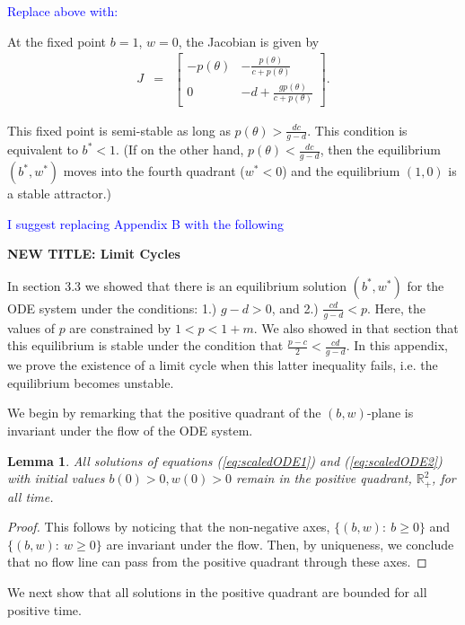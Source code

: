 \documentclass[review,authoryear]{elsarticle}
\newtheorem{lemma}[theorem]{Lemma}
\begin{document}
\textcolor{blue}{Replace above with:}

At the fixed point $b=1$, $w=0$, the Jacobian is given by 
\begin{eqnarray*}
  J & = & \left[
          \begin{array}{cc}
            -p(\theta) & -\frac{p(\theta)}{c+p(\theta)} \\
            0 & -d+\frac{gp(\theta)}{c+p(\theta)}
          \end{array}
          \right].
\end{eqnarray*}

This fixed point is semi-stable as long as $p(\theta) >\frac{dc}{g-d}$.  This condition is equivalent to $b^* < 1$.  (If on the other hand, $p(\theta) <\frac{dc}{g-d}$, then the equilibrium $(b^*,w^*)$ moves into the fourth quadrant ($w^*<0$) and the equilibrium $(1,0)$ is a stable attractor.)

\textcolor{blue}{I suggest replacing Appendix B with the following}

\textbf{NEW TITLE:  Limit Cycles}

In section 3.3 we showed that there is an equilibrium solution $(b^*,w^*)$ for the ODE system under the conditions:  1.)  $g-d>0$, and 2.) $\frac{cd}{g-d}<p$.   Here, the values of  $p$ are constrained by $1<p<1+m$.   We also showed in that section that this 
equilibrium is stable under the condition that $\frac{p-c}{2} < \frac{cd}{g-d}.$   In this appendix, we prove the existence of a limit cycle when this latter inequality fails, i.e. the equilibrium becomes unstable.

We begin by remarking that the positive quadrant of the $(b,w)$-plane is invariant under the flow of the ODE system.

\begin{lemma}


All solutions of equations (\ref{eq:scaledODE1}) and
  (\ref{eq:scaledODE2}) with initial values
  $b\left( 0\right) > 0 ,w\left( 0\right) >0$ remain in the positive quadrant, $\mathbb R_+^2$, for all time.
\end{lemma}

\begin{proof}
  This follows by noticing that the non-negative axes, $\{(b,w):\  b \ge 0\}$ and $\{(b,w):\  w\ge 0\}$ are invariant under the flow.  Then, by uniqueness, we conclude that no flow line can pass from the positive quadrant through these axes.
\end{proof}

We next show that all solutions in the positive quadrant are bounded for all positive time.  
\end{document}
